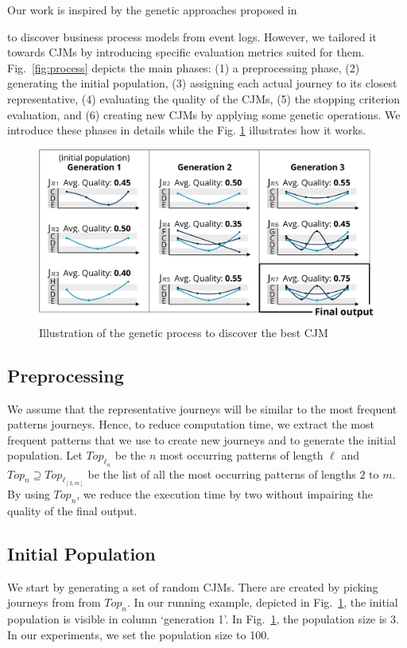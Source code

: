 \documentclass[runningheads]{llncs}
\begin{document}
{Our work is inspired by the genetic approaches proposed in \cite{buijs2012genetic,vazquez2015prodigen,de2005genetic} {to discover business process models from event logs. However, we tailored it towards CJMs by introducing specific evaluation metrics suited for them. Fig.~\ref{fig:process} depicts the main phases: (1) a preprocessing phase, (2) generating the initial population, (3) assigning each actual journey to its closest representative, (4) evaluating the quality of the CJMs, (5) the stopping criterion evaluation, and (6) creating new CJMs by applying some genetic operations. We introduce these phases in details while the Fig. \ref{fig:intuition2} illustrates how it works. 

\begin{figure}
\centering
\includegraphics[width=0.7\columnwidth]{05_schema/intuition2.pdf}
  \caption{Illustration of the genetic process to discover the best CJM}
  \label{fig:intuition2}
\end{figure}

\subsection{Preprocessing} \label{preprocessing}
We assume that the representative journeys will be similar to the most frequent patterns journeys. Hence, to reduce computation time, we extract the most frequent patterns that we use to create new journeys and to generate the initial population. Let $Top_{\ell_n}$ be the $n$ most occurring patterns of length $\ell$ and $Top_n \supseteq Top_{\ell_{[2,m]}}$ be the list of all the most occurring patterns of lengths $2$ to $m$. By using $Top_n$, we reduce the execution time by two without impairing the quality of the final output.

\subsection{Initial Population}
\label{chap:initial-population}
We start by generating a set of random CJMs. There are created by picking journeys from from $Top_n$. In our running example, depicted in Fig.~\ref{fig:intuition2}, the initial population is visible in column `generation 1'. In Fig.~\ref{fig:intuition2}, the population size is 3. In our experiments, we set the population size to 100. 

}}
\end{document}
